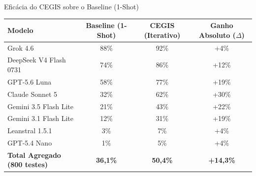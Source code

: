 \documentclass[aspectratio=169, 10pt]{beamer}
\begin{document}
\begin{frame}{Efic\'{a}cia do CEGIS sobre o Baseline (1-Shot)}
    \centering
    \vspace{0.5em}
    \small
    \begin{tabular}{lccc}
        \toprule
        \textbf{Modelo} & \textbf{Baseline (1-Shot)} & \textbf{CEGIS (Iterativo)} & \textbf{Ganho Absoluto ($\Delta$)} \\
        \midrule
        Grok 4.6 & 88\% & 92\% & +4\% \\
        DeepSeek V4 Flash 0731 & 74\% & 86\% & +12\% \\
        GPT-5.6 Luna & 58\% & 77\% & +19\% \\
        Claude Sonnet 5 & 32\% & 62\% & +30\% \\
        Gemini 3.5 Flash Lite & 21\% & 43\% & +22\% \\
        Gemini 3.1 Flash Lite & 12\% & 31\% & +19\% \\
        Leanstral 1.5.1 & 3\% & 7\% & +4\% \\
        GPT-5.4 Nano & 1\% & 5\% & +4\% \\
        \midrule
        \textbf{Total Agregado (800 testes)} & \textbf{36,1\%} & \textbf{50,4\%} & \textbf{+14,3\%} \\
        \bottomrule
    \end{tabular}
\end{frame}
\end{document}
